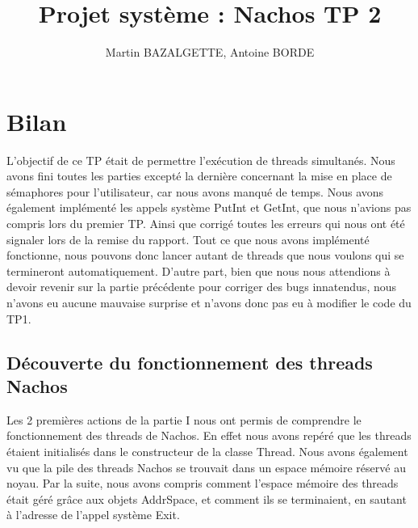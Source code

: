 \documentclass[12pt]{article}
\begin{document}
\title{Projet système : Nachos TP 2}
\author{Martin BAZALGETTE, Antoine BORDE}
\maketitle

\newpage
\tableofcontents
\newpage

\section{Bilan}
L'objectif de ce TP était de permettre l'exécution de threads simultanés.
Nous avons fini toutes les parties excepté la dernière concernant la mise en place de sémaphores pour l'utilisateur, car nous avons manqué de temps.
Nous avons également implémenté les appels système PutInt et GetInt,
que nous n'avions pas compris lors du premier TP. Ainsi que corrigé toutes les erreurs qui
nous ont été signaler lors de la remise du rapport.
Tout ce que nous avons implémenté fonctionne, nous pouvons donc lancer autant de threads que nous voulons qui se termineront automatiquement.
D'autre part, bien que nous nous attendions à devoir revenir sur la partie précédente pour corriger des bugs innatendus, nous n'avons eu aucune mauvaise surprise et n'avons donc pas eu à modifier le code du TP1.

\subsection{Découverte du fonctionnement des threads Nachos}
Les 2 premières actions de la partie I nous ont permis de comprendre le fonctionnement des threads de Nachos. En effet nous avons repéré que les threads étaient initialisés dans le constructeur de la classe Thread. Nous avons également vu que la pile des threads Nachos se trouvait dans un espace mémoire réservé au noyau.
Par la suite, nous avons compris comment l'espace mémoire des threads était géré grâce aux objets AddrSpace, et comment ils se terminaient, en sautant à l'adresse de l'appel système Exit.
\end{document}
